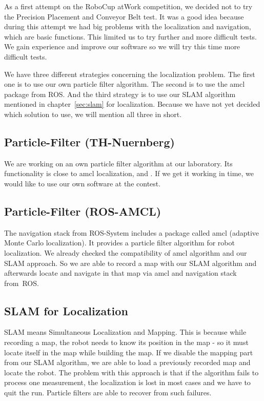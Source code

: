 As a first attempt on the RoboCup atWork  competition, we decided not to try the Precision Placement and Conveyor Belt test. It was a good idea because during this attempt we had big problems with the localization and navigation, which are basic functions. This limited us to try further and more difficult tests. We gain experience and improve our software so we will try this time more difficult tests.

We have three different strategies concerning the localization problem. The first one is to use our own particle filter algorithm. The second is to use the amcl package from ROS. And the third strategy is to use our SLAM algorithm mentioned in chapter~\ref{sec:slam} for localization. Because we have not yet decided which solution to use, we will mention all three in short.

\subsection{Particle-Filter (TH-Nuernberg)}
We are working on an own particle filter algorithm at our laboratory. Its functionality is close to amcl localization, \cite{pf_fox} and \cite{pr}. If we get it working in time, we would like to use our own software at the contest.

\subsection{Particle-Filter (ROS-AMCL)}
The navigation stack from ROS-System includes a package called amcl (adaptive Monte Carlo localization). It provides a particle filter algorithm for robot localization. We already checked the compatibility of amcl algorithm and our SLAM approach. So we are able to record a map with our SLAM algorithm and afterwards locate and navigate in that map via amcl and navigation stack from~ROS.

\subsection{SLAM for Localization}
SLAM means Simultaneous Localization and Mapping. This is because while recording a map, the robot needs to know its position in the map - so it must locate itself in the map while building the map. If we disable the mapping part from our SLAM algorithm, we are able to load a previously recorded map and locate the robot. The problem with this approach is that if the algorithm fails to process one measurement, the localization is lost in most cases and we have to quit the run. Particle filters are able to recover from such failures.

